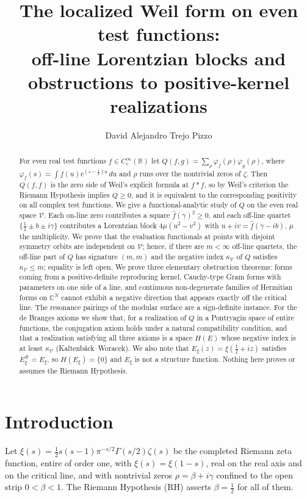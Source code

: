 \documentclass[11pt]{amsart}
\title[The localized Weil form on even test functions]{The localized Weil form on even test
functions:\\ off-line Lorentzian blocks and obstructions to positive-kernel realizations}
\author{David Alejandro Trejo Pizzo}
\theoremstyle{definition}
\theoremstyle{remark}
\newcommand{\RH}{\mathrm{RH}}
\newcommand{\half}{\tfrac12}
\newcommand{\fhat}{\widehat f}
\newcommand{\kV}{\kappa_{\mathcal V}}
\begin{document}
\begin{abstract}
For even real test functions $f\in C_c^\infty(\mathbb R)$ let
$Q(f,g)=\sum_\rho\varphi_f(\rho)\varphi_g(\rho)$, where $\varphi_f(s)=\int f(u)e^{(s-\frac12)u}\,du$
and $\rho$ runs over the nontrivial zeros of $\zeta$. Then $Q(f,f)$ is the zero side of Weil's
explicit formula at $f*f$, so by Weil's criterion the Riemann Hypothesis implies $Q\ge0$, and
it is equivalent to the corresponding positivity on all complex test functions. We give a
functional-analytic study of $Q$ on the even real space $\mathcal V$. Each on-line zero
contributes a square $\fhat(\gamma)^2\ge0$, and each off-line quartet $\{\half\pm b\pm i\gamma\}$
contributes a Lorentzian block $4\mu(u^2-v^2)$ with $u+iv=\fhat(\gamma-ib)$, $\mu$ the multiplicity. We prove that the
evaluation functionals at points with disjoint symmetry orbits are independent on $\mathcal V$;
hence, if there are $m<\infty$ off-line quartets, the off-line part of $Q$ has signature $(m,m)$
and the negative index $\kV$ of $Q$ satisfies $\kV\le m$; equality is left open. We prove three
elementary obstruction theorems: forms coming from a positive-definite reproducing kernel,
Cauchy-type Gram forms with parameters on one side of a line, and continuous non-degenerate
families of Hermitian forms on $\mathbb C^N$ cannot exhibit a negative direction that appears
exactly off the critical line. The resonance pairings of the modular surface are a sign-definite
instance. For the de Branges axioms we show that, for a realization of $Q$ in a Pontryagin space
of entire functions, the conjugation axiom holds under a natural compatibility condition, and
that a realization satisfying all three axioms is a space $H(E)$ whose negative index is at least
$\kV$ (Kaltenb\"ack--Woracek). We also note that $E_\xi(z)=\xi(\half+iz)$ satisfies
$E_\xi^\#=E_\xi$, so $H(E_\xi)=\{0\}$ and $E_\xi$ is not a structure function. Nothing here
proves or assumes the Riemann Hypothesis.
\end{abstract}
\maketitle

\tableofcontents
\newpage

\section{Introduction}

Let $\xi(s)=\half s(s-1)\pi^{-s/2}\Gamma(s/2)\zeta(s)$ be the completed Riemann zeta
function, entire of order one, with $\xi(s)=\xi(1-s)$, real on the real axis and on the critical
line, and with nontrivial zeros $\rho=\beta+i\gamma$ confined to the open strip $0<\beta<1$. The
Riemann Hypothesis ($\RH$) asserts $\beta=\half$ for all of them.
\end{document}
